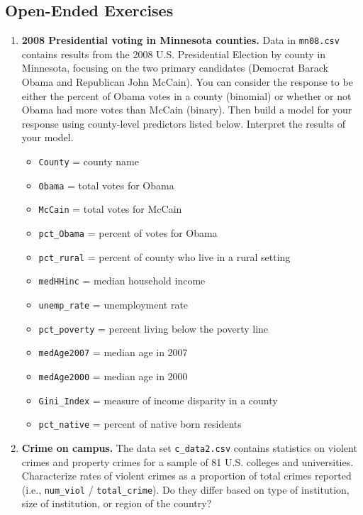 \documentclass[
]{krantz}
\providecommand{\tightlist}{%
  \setlength{\itemsep}{0pt}\setlength{\parskip}{0pt}}
\begin{document}
\subsection{Open-Ended Exercises}\label{open-ended-exercises-3}

\begin{enumerate}
\def\labelenumi{\arabic{enumi}.}
\item
  \textbf{2008 Presidential voting in Minnesota counties.} Data in \texttt{mn08.csv} contains results from the 2008 U.S. Presidential Election by county in Minnesota, focusing on the two primary candidates (Democrat Barack Obama and Republican John McCain). You can consider the response to be either the percent of Obama votes in a county (binomial) or whether or not Obama had more votes than McCain (binary). Then build a model for your response using county-level predictors listed below. Interpret the results of your model.

  \begin{itemize}
  \tightlist
  \item
    \texttt{County} = county name
  \item
    \texttt{Obama} = total votes for Obama
  \item
    \texttt{McCain} = total votes for McCain
  \item
    \texttt{pct\_Obama} = percent of votes for Obama
  \item
    \texttt{pct\_rural} = percent of county who live in a rural setting
  \item
    \texttt{medHHinc} = median household income
  \item
    \texttt{unemp\_rate} = unemployment rate
  \item
    \texttt{pct\_poverty} = percent living below the poverty line
  \item
    \texttt{medAge2007} = median age in 2007
  \item
    \texttt{medAge2000} = median age in 2000
  \item
    \texttt{Gini\_Index} = measure of income disparity in a county
  \item
    \texttt{pct\_native} = percent of native born residents
  \end{itemize}
\item
  \textbf{Crime on campus.} The data set \texttt{c\_data2.csv} contains statistics on violent crimes and property crimes for a sample of 81 U.S. colleges and universities. Characterize rates of violent crimes as a proportion of total crimes reported (i.e., \texttt{num\_viol} / \texttt{total\_crime}). Do they differ based on type of institution, size of institution, or region of the country?


\end{enumerate}
\end{document}
